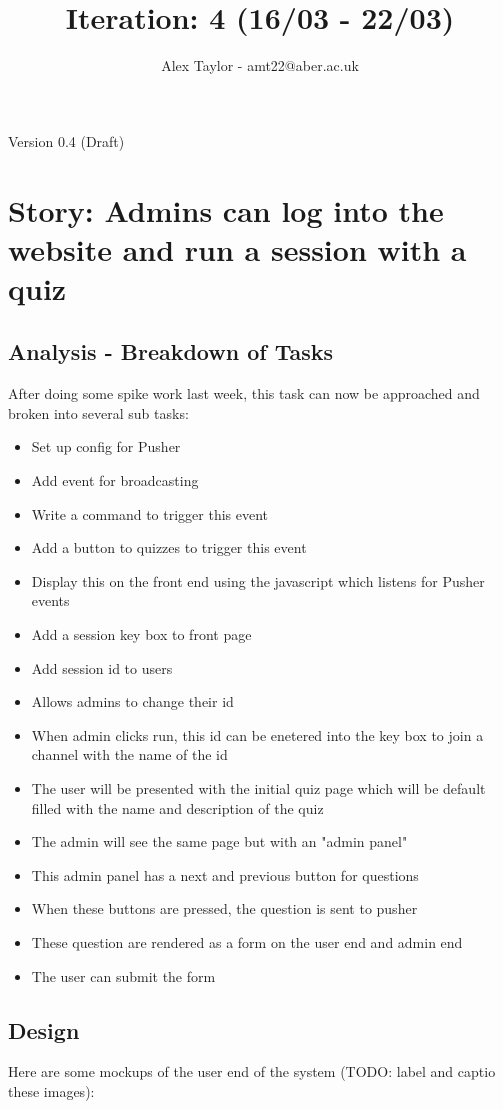 \documentclass{article}
\title{Iteration: 4 (16/03 - 22/03)}
\author{Alex Taylor - amt22@aber.ac.uk}
\begin{document}
\maketitle
\begin{center}
	Version 0.4 (Draft)
\end{center}
\tableofcontents
\thispagestyle{empty}
\newpage

\section{Story: Admins can log into the website and run a session with a quiz}
\subsection{Analysis - Breakdown of Tasks}
After doing some spike work last week, this task can now be approached and broken into several sub tasks:
\begin{itemize}
	\item Set up config for Pusher
	\item Add event for broadcasting
	\item Write a command to trigger this event
	\item Add a button to quizzes to trigger this event
	\item Display this on the front end using the javascript which listens for Pusher events
	\item Add a session key box to front page
	\item Add session id to users
	\item Allows admins to change their id
	\item When admin clicks run, this id can be enetered into the key box to join a channel with the name of the id
	\item The user will be presented with the initial quiz page which will be default filled with the name and description of the quiz
	\item The admin will see the same page but with an "admin panel"
	\item This admin panel has a next and previous button for questions
	\item When these buttons are pressed, the question is sent to pusher
	\item These question are rendered as a form on the user end and admin end
	\item The user can submit the form
\end{itemize}
\subsection{Design}
Here are some mockups of the user end of the system (TODO: label and captio these images): 
\end{document}
